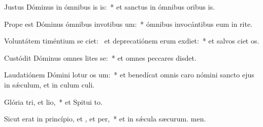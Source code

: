\item Justus Dóminus in ómnibus is is:~* et sanctus in ómnibus oribus is.
\item Prope est Dóminus ómnibus invotibus um:~* ómnibus invocántibus eum in rite.
\item Voluntátem timéntium se ciet:~\pscross{} et deprecatiónem erum exdiet:~* et salvos ciet os.
\item Custódit Dóminus omnes lites se:~* et omnes peccares disdet.
\item Laudatiónem Dómini lotur os um:~* et benedícat omnis caro nómini sancto ejus in sǽculum, et in culum culi.
\item Glória tri, et lio,~* et Spitui to.
\item Sicut erat in princípio, et , et per,~* et in sǽcula sæcurum. men.
